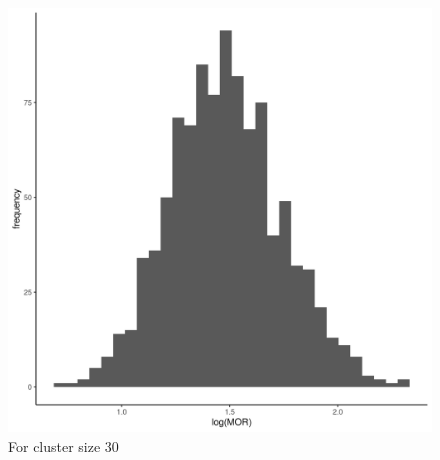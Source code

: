 \documentclass[
  letterpaper,
  DIV=11,
  numbers=noendperiod,
  titlepage]{scrartcl}
\begin{document}
\begin{figure}
\begin{minipage}[t]{0.50\linewidth}
{{\includegraphics{../../plots/two-lvl-ran-int/high-prev/hist_30_30_two_lvl_high_prev.png}

}

\caption{For cluster size 30}

}

\end{minipage}%
%
\begin{minipage}[t]{0.50\linewidth}

{\centering 

}
\end{minipage}
\end{figure}
\end{document}
